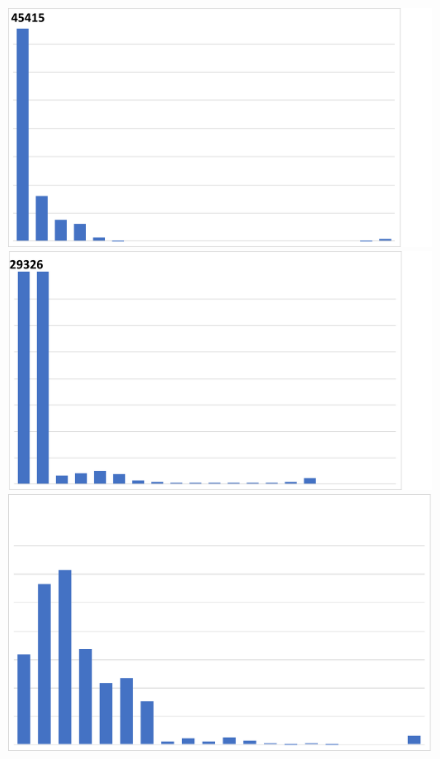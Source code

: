 \begin{figure}
\begin{minipage}[t]{0.33\linewidth}
\label{fig:sw4_histograms}
\end{minipage}%
\setcounter{subfigure}{0}
\hfill
\begin{minipage}[t]{0.66\linewidth}%
\begin{framed}
\begin{minipage}[t]{0.24\textwidth}%
\includegraphics[width=0.95\linewidth, trim={0cm 0cm 2.5cm 0cm}, clip]{results/nyx/Eul25_AvgL2.pdf}
\vspace{-2mm}
\end{minipage}%
\hfill
\begin{minipage}[t]{0.24\textwidth}%
\includegraphics[width=0.95\linewidth, trim={0cm 0cm 2.5cm 0cm}, clip]{results/nyx/Eul50_AvgL2.pdf}
\vspace{-2mm}
\end{minipage}
\begin{minipage}[t]{0.24\textwidth}%
\includegraphics[width=0.95\linewidth]{results/nyx/Eul100_AvgL2.pdf}

\end{minipage}
\end{framed}
\end{minipage}
\end{figure}
